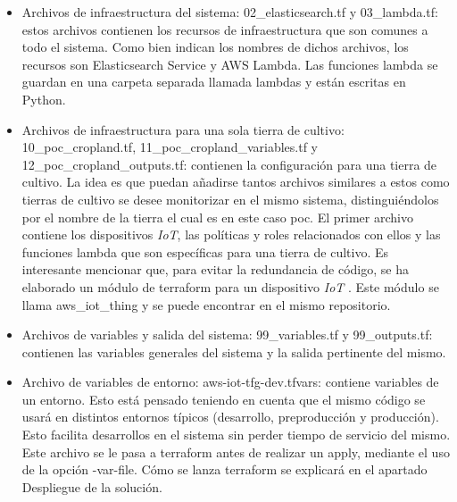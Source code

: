 \documentclass[../../memoria.tex]{subfiles}
\begin{document}
\begin{enumerate}
\begin{itemize}
              \item Archivos de infraestructura del sistema: 02\_elasticsearch.tf y 03\_lambda.tf: estos archivos contienen los recursos de infraestructura que son comunes a todo el sistema. Como bien indican los nombres de dichos archivos, los recursos son Elasticsearch Service y AWS Lambda. Las funciones lambda se guardan en una carpeta separada llamada lambdas y están escritas en Python.

              \item Archivos de infraestructura para una sola tierra de cultivo: 10\_poc\_cropland.tf, 11\_poc\_cropland\_variables.tf y 12\_poc\_cropland\_outputs.tf: contienen la configuración para una tierra de cultivo. La idea es que puedan añadirse tantos archivos similares a estos como tierras de cultivo se desee monitorizar en el mismo sistema, distinguiéndolos por el nombre de la tierra el cual es en este caso poc. El primer archivo contiene los dispositivos \textit{IoT}, las políticas y roles relacionados con ellos y las funciones lambda que son específicas para una tierra de cultivo. Es interesante mencionar que, para evitar la redundancia de código, se ha elaborado un módulo de terraform para un dispositivo \textit{IoT} \cite{terraformmodules}. Este módulo se llama aws\_iot\_thing y se puede encontrar en el mismo repositorio.

              \item Archivos de variables y salida del sistema: 99\_variables.tf y 99\_outputs.tf: contienen las variables generales del sistema y la salida pertinente del mismo.

              \item Archivo de variables de entorno: aws-iot-tfg-dev.tfvars: contiene variables de un entorno. Esto está pensado teniendo en cuenta que el mismo código se usará en distintos entornos típicos (desarrollo, preproducción y producción). Esto facilita desarrollos en el sistema sin perder tiempo de servicio del mismo. Este archivo se le pasa a terraform antes de realizar un apply, mediante el uso de la opción -var-file. Cómo se lanza terraform se explicará en el apartado Despliegue de la solución.
          \end{itemize}

\end{enumerate}
\end{document}
